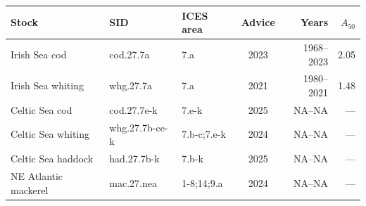 \begin{tabular}{@{}lllcrr@{}}
\toprule
Stock & SID & ICES area & Advice & Years & $A_{50}$ \\
\midrule
Irish Sea cod & cod.27.7a & 7.a & 2023 & 1968--2023 & 2.05 \\
Irish Sea whiting & whg.27.7a & 7.a & 2021 & 1980--2021 & 1.48 \\
Celtic Sea cod & cod.27.7e-k & 7.e-k & 2025 & NA--NA & --- \\
Celtic Sea whiting & whg.27.7b-ce-k & 7.b-c;7.e-k & 2024 & NA--NA & --- \\
Celtic Sea haddock & had.27.7b-k & 7.b-k & 2025 & NA--NA & --- \\
NE Atlantic mackerel & mac.27.nea & 1-8;14;9.a & 2024 & NA--NA & --- \\
\bottomrule
\end{tabular}
